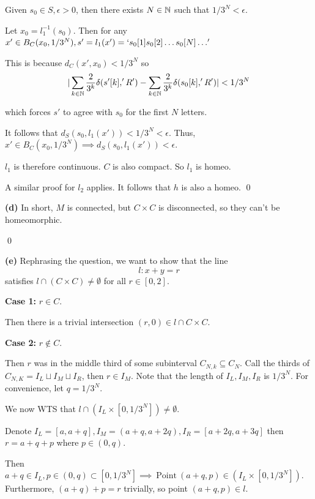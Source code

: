 \documentclass[a4paper, 12pt]{article}
\begin{document}
\begin{solution}
    Given $s_0 \in S, \epsilon > 0$, then there exists $N \in \mathbb{N}$ such that $1/3^N < \epsilon$.

    Let $x_0 = l_1^{-1}(s_0)$. Then for any $x' \in B_C(x_0, 1/3^N), s' = l_1(x') = `s_0[1]s_0[2]\dots s_0[N]\dots'$

    This is because $d_C(x', x_0) < 1/3^N$ so \[
        |\sum_{k \in \mathbb{N}} \frac{2}{3^k}\delta(s'[k], 'R') - \sum_{k \in \mathbb{N}} \frac{2}{3^k}\delta(s_0[k], 'R')| < 1/3^N
    \]

    which forces $s'$ to agree with $s_0$ for the first $N$ letters.

    It follows that $d_S(s_0, l_1(x')) < 1/3^N < \epsilon$. Thus, $x' \in B_C(x_0, 1/3^N) \implies d_S(s_0, l_1(x')) < \epsilon$.

    $l_1$ is therefore continuous. $C$ is also compact. So $l_1$ is homeo.

    A similar proof for $l_2$ applies. It follows that $h$ is also a homeo. \qed

    \textbf{(d)} In short, $M$ is connected, but $C \times C$ is disconnected, so they can't be homeomorphic.

    \qed

    \textbf{(e)} Rephrasing the question, we want to show that the line \[
        l: x + y = r
    \]
    satisfies $l \cap (C \times C) \neq \emptyset$ for all $r \in [0, 2]$.

    \textbf{Case 1:} $r \in C$.

    Then there is a trivial intersection $(r, 0) \in l \cap C \times C $.

    \textbf{Case 2:} $r \not \in C$.

    Then $r$ was in the middle third of some subinterval $C_{N, k} \subseteq C_N$. Call the thirds of $C_{N, K} = I_L \sqcup I_M \sqcup I_R$, then $r \in I_M$. Note that the length of $I_L, I_M, I_R$ is $1/3^N$. For convenience, let $q = 1/3^N$.

    We now WTS that $l \cap (I_L \times [0, 1/3^N]) \neq \emptyset$.

    Denote $I_L = [a, a + q], I_M = (a + q, a + 2q), I_R = [a + 2q, a + 3q]$ then $r = a + q + p$ where $p \in (0, q)$.

    Then $a + q \in I_L, p \in (0, q) \subset [0, 1/3^N] \implies \:\text{Point}\:  (a + q, p) \in (I_L \times [0, 1/3^N])$. Furthermore, $(a + q) + p = r$ trivially, so point $(a + q, p) \in l$.


\end{solution}
\end{document}
